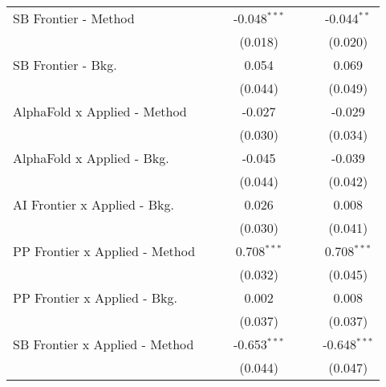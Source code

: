 \begin{tabular}{lcccccc}
   SB Frontier - Method           &             &               & -0.048$^{***}$ &              &               & -0.044$^{**}$\\   
                                  &             &               & (0.018)        &              &               & (0.020)\\   
   SB Frontier - Bkg.             &             &               & 0.054          &              &               & 0.069\\   
                                  &             &               & (0.044)        &              &               & (0.049)\\   
   AlphaFold x Applied - Method   &             &               & -0.027         &              &               & -0.029\\   
                                  &             &               & (0.030)        &              &               & (0.034)\\   
   AlphaFold x Applied - Bkg.     &             &               & -0.045         &              &               & -0.039\\   
                                  &             &               & (0.044)        &              &               & (0.042)\\   
   AI Frontier x Applied - Bkg.   &             &               & 0.026          &              &               & 0.008\\   
                                  &             &               & (0.030)        &              &               & (0.041)\\   
   PP Frontier x Applied - Method &             &               & 0.708$^{***}$  &              &               & 0.708$^{***}$\\   
                                  &             &               & (0.032)        &              &               & (0.045)\\   
   PP Frontier x Applied - Bkg.   &             &               & 0.002          &              &               & 0.008\\   
                                  &             &               & (0.037)        &              &               & (0.037)\\   
   SB Frontier x Applied - Method &             &               & -0.653$^{***}$ &              &               & -0.648$^{***}$\\   
                                  &             &               & (0.044)        &              &               & (0.047)\\   

\end{tabular}
